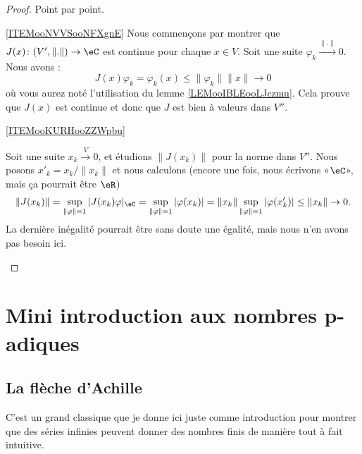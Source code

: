 \begin{proof}
    Point par point.
    \begin{subproof}
        \item[\ref{ITEMooNVVSooNFXgnE}]
            Nous commençons par montrer que \( J(x)\colon (V',\| . \|)\to \eC\) est continue pour chaque \( x\in V\). Soit une suite \( \varphi_k\stackrel{\| . \|}{\longrightarrow}0\). Nous avons :
            \begin{equation}
                J(x)\varphi_k=\varphi_k(x)\leq \| \varphi_k \|\| x \|\to 0
            \end{equation}
            où vous aurez noté l'utilisation du lemme \ref{LEMooIBLEooLJczmu}.  Cela prouve que \( J(x)\) est continue et donc que \( J\) est bien à valeurs dans \( V''\). 
        \item[\ref{ITEMooKURHooZZWpbu}]

            Soit une suite \( x_k\stackrel{V}{\longrightarrow}0\), et étudions \( \| J(x_k) \|\) pour la norme dans \( V''\). Nous posons \( x'_k=x_k/\| x_k \|\) et nous calculons (encore une fois, nous écrivons «\( \eC\)», mais ça pourrait être \( \eR\))
            \begin{equation}
                \| J(x_k) \|=\sup_{\| \varphi \|=1}| J(x_k)\varphi |_{\eC}=\sup_{\| \varphi \|=1}| \varphi(x_k) |=\| x_k \|\sup_{\| \varphi \|=1}| \varphi(x'_k) |\leq \| x_k \|\to 0.
            \end{equation}
            La dernière inégalité pourrait être sans doute une égalité, mais nous n'en avons pas besoin ici.
    \end{subproof}
\end{proof}

\section{Mini introduction aux nombres \texorpdfstring{p}{$p$}-adiques}

\subsection{La flèche d'Achille}\label{s:un}

C'est un grand classique que je donne ici juste comme introduction pour montrer que des séries infinies peuvent donner des nombres finis de manière tout à fait intuitive.

